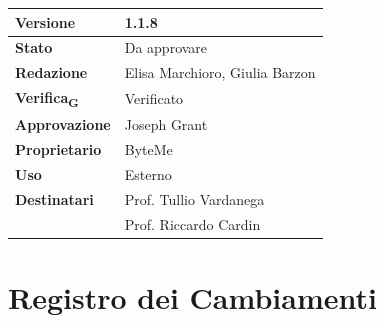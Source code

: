 \documentclass[11pt,a4paper]{article}
\newcommand{\gls}[1]{#1\textsubscript{G}}
\begin{document}
\begin{titlepage}
    \begin{table}[H]
        \centering
        \begin{tabular}{|l|p{5cm}|}
            \hline
            \textbf{Versione} & 1.1.8 \\
            \hline
            \textbf{Stato} & Da approvare \\
            \hline
            \textbf{Redazione} & Elisa Marchioro, Giulia Barzon \\
            \hline
            \textbf{\gls{Verifica}} & Verificato \\
            \hline
            \textbf{Approvazione} & Joseph Grant \\
            \hline
            \textbf{Proprietario} & ByteMe \\
            \hline
            \textbf{Uso} & Esterno \\
            \hline
            \textbf{Destinatari} & Prof. Tullio Vardanega \\ & Prof. Riccardo Cardin \\
            \hline
        \end{tabular}
    \end{table}
    
    \vfill
\end{titlepage}

\thispagestyle{empty}
\section*{Registro dei Cambiamenti}
\end{document}
